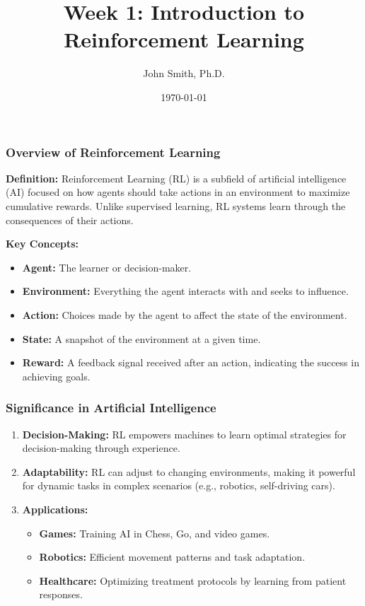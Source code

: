 \documentclass[aspectratio=169]{beamer}
\title[Introduction to Reinforcement Learning]{Week 1: Introduction to Reinforcement Learning}
\author[J. Smith]{John Smith, Ph.D.}
\institute[University Name]{Department of Computer Science \\ University Name \\ Email: email@university.edu \\ Website: www.university.edu}
\date{\today}
\begin{document}
\frame{\titlepage}

\begin{frame}[fragile]
    \titlepage
\end{frame}

\begin{frame}[fragile]
    \frametitle{Overview of Reinforcement Learning}
    
    \textbf{Definition:} Reinforcement Learning (RL) is a subfield of artificial intelligence (AI) focused on how agents should take actions in an environment to maximize cumulative rewards. Unlike supervised learning, RL systems learn through the consequences of their actions.
    
    \textbf{Key Concepts:}
    \begin{itemize}
        \item \textbf{Agent:} The learner or decision-maker.
        \item \textbf{Environment:} Everything the agent interacts with and seeks to influence.
        \item \textbf{Action:} Choices made by the agent to affect the state of the environment.
        \item \textbf{State:} A snapshot of the environment at a given time.
        \item \textbf{Reward:} A feedback signal received after an action, indicating the success in achieving goals.
    \end{itemize}
\end{frame}

\begin{frame}[fragile]
    \frametitle{Significance in Artificial Intelligence}

    \begin{enumerate}
        \item \textbf{Decision-Making:} RL empowers machines to learn optimal strategies for decision-making through experience.
        
        \item \textbf{Adaptability:} RL can adjust to changing environments, making it powerful for dynamic tasks in complex scenarios (e.g., robotics, self-driving cars).
        
        \item \textbf{Applications:}
        \begin{itemize}
            \item \textbf{Games:} Training AI in Chess, Go, and video games.
            \item \textbf{Robotics:} Efficient movement patterns and task adaptation.
            \item \textbf{Healthcare:} Optimizing treatment protocols by learning from patient responses.
        \end{itemize}
    \end{enumerate}
\end{frame}
\end{document}
